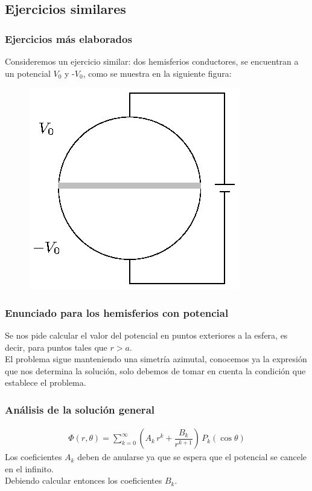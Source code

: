 \documentclass[12pt]{beamer}
\begin{document}
\subsection*{Ejercicios similares}

\begin{frame}
\frametitle{Ejercicios más elaborados}
Consideremos un ejercicio similar: dos hemisferios conductores, se encuentran a un potencial $V_{0}$ y -$V_{0}$, como se muestra en la siguiente figura:
\begin{figure}
    \centering
    \includegraphics[scale=0.8]{Imagenes/Ejemplo_Esfera_03.eps}
\end{figure}
\end{frame}
\begin{frame}
\frametitle{Enunciado para los hemisferios con potencial}
Se nos pide calcular el valor del potencial en puntos exteriores a la esfera, es decir, para puntos tales que $r > a$.
\\
\bigskip
\pause
El problema sigue manteniendo una simetría azimutal, conocemos ya la expresión que nos determina la solución, solo debemos de tomar en cuenta la condición que establece el problema.
\end{frame}
\begin{frame}
\frametitle{Análisis de la solución general}
\begin{align*}
\Phi (r, \theta) = \sum_{k=0}^{\infty} \left( A_{k} \, r^{k} + \dfrac{B_{k}}{r^{k+1}} \right) \, P_{k} (\cos \theta)
\end{align*}
Los coeficientes $A_{k}$ deben de anularse ya que se espera que el potencial se cancele en el infinito. \pause
\\
\bigskip
Debiendo calcular entonces los coeficientes $B_{k}$.
\end{frame}
\end{document}
